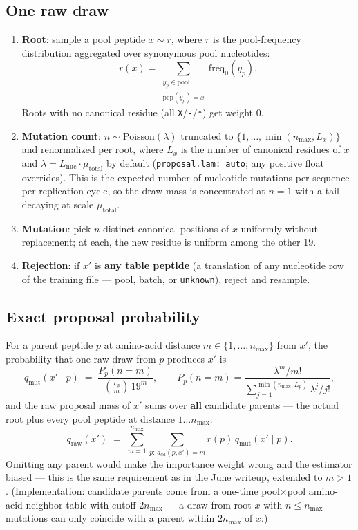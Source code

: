 \documentclass[11pt]{article}
\begin{document}
\subsection{One raw draw}\label{sec:draw}
\begin{enumerate}
\item \textbf{Root}: sample a pool peptide $x \sim r$, where $r$ is the
pool-frequency distribution aggregated over synonymous pool nucleotides:
\begin{equation}
r(x) = \sum_{\substack{y_p \in \text{pool}\\ \text{pep}(y_p)=x}}
\text{freq}_0(y_p).
\end{equation}
Roots with no canonical residue (all \texttt{X}/\texttt{-}/\texttt{*})
get weight 0.
\item \textbf{Mutation count}: $n \sim \text{Poisson}(\lambda)$
truncated to $\{1, \dots, \min(n_{\max}, L_x)\}$ and renormalized per
root, where $L_x$ is the number of canonical residues of $x$ and
$\lambda = L_{\text{nuc}} \cdot \mu_{\text{total}}$ by default
(\texttt{proposal.lam: auto}; any positive float overrides). This is the
expected number of nucleotide mutations per sequence per replication
cycle, so the draw mass is concentrated at $n = 1$ with a tail decaying
at scale $\mu_{\text{total}}$.
\item \textbf{Mutation}: pick $n$ distinct canonical positions of $x$
uniformly without replacement; at each, the new residue is uniform among
the other 19.
\item \textbf{Rejection}: if $x'$ is \textbf{any table peptide} (a
translation of any nucleotide row of the training file --- pool, batch,
or \texttt{unknown}), reject and resample.
\end{enumerate}

\subsection{Exact proposal probability}\label{sec:q}

For a parent peptide $p$ at amino-acid distance
$m \in \{1, \dots, n_{\max}\}$ from $x'$, the probability that one raw
draw from $p$ produces $x'$ is
\begin{equation}\label{eq:qmut}
q_{\text{mut}}(x' \mid p) \;=\; \frac{P_p(n = m)}
{\binom{L_p}{m}\, 19^{m}},
\qquad
P_p(n=m) = \frac{\lambda^m / m!}
{\sum_{j=1}^{\min(n_{\max}, L_p)} \lambda^j / j!},
\end{equation}
and the raw proposal mass of $x'$ sums over \textbf{all} candidate
parents --- the actual root plus every pool peptide at distance
$1 \dots n_{\max}$:
\begin{equation}\label{eq:qraw}
q_{\text{raw}}(x') \;=\; \sum_{m=1}^{n_{\max}}
\sum_{p:\, d_{aa}(p, x') = m} r(p)\, q_{\text{mut}}(x' \mid p).
\end{equation}
Omitting any parent would make the importance weight wrong and the
estimator biased --- this is the same requirement as in the June writeup,
extended to $m > 1$. (Implementation: candidate parents come from a
one-time pool$\times$pool amino-acid neighbor table with cutoff
$2 n_{\max}$ --- a draw from root $x$ with $n \le n_{\max}$ mutations can
only coincide with a parent within $2 n_{\max}$ of $x$.)
\end{document}
